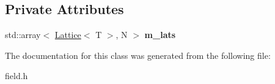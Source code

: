 \subsection*{Private Attributes}
\begin{DoxyCompactItemize}
\item 
std\+::array$<$ \hyperlink{classLattice}{Lattice}$<$ T $>$, N $>$ {\bfseries m\+\_\+lats}\hypertarget{classField_a77cf6ee4ca0b27bb2a92572a4d705044}{}\label{classField_a77cf6ee4ca0b27bb2a92572a4d705044}

\end{DoxyCompactItemize}


The documentation for this class was generated from the following file\+:\begin{DoxyCompactItemize}
\item 
field.\+h\end{DoxyCompactItemize}
